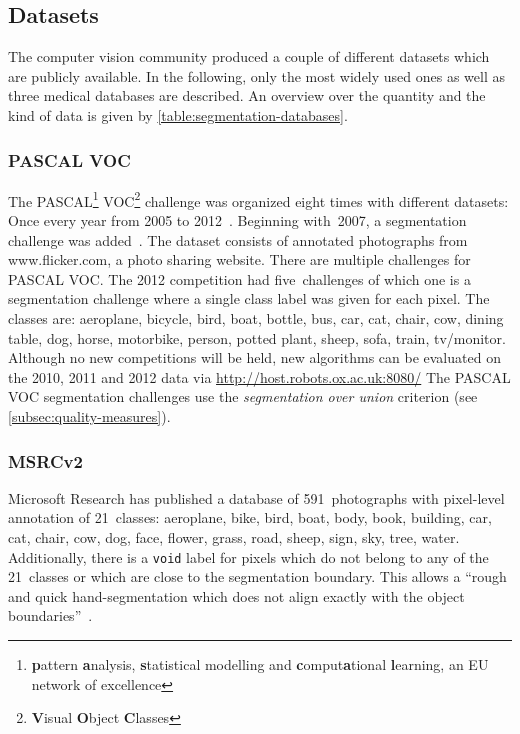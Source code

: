 \documentclass[technote,a4paper,leqno]{IEEEtran}
\begin{document}
\subsection{Datasets}
The computer vision community produced a couple of different datasets which are
publicly available. In the following, only the most widely used ones as well as
three medical databases are described. An overview over the quantity and
the kind of data is given by
\cref{table:segmentation-databases}.
\subsubsection{PASCAL VOC}
The PASCAL\footnote{\textbf{p}attern \textbf{a}nalysis, \textbf{s}tatistical
modelling and \textbf{c}omput\textbf{a}tional \textbf{l}earning, an EU network
of excellence} VOC\footnote{\textbf{V}isual \textbf{O}bject \textbf{C}lasses}
challenge was organized eight times with different datasets: Once every year
from 2005 to 2012~\cite{pascal-voc-2012}. Beginning with~2007, a segmentation
challenge was added~\cite{pascal-voc-2007}.
The dataset consists of annotated photographs from www.flicker.com, a photo
sharing website. There are multiple challenges for PASCAL VOC\@. The 2012
competition had five~challenges of which one is a segmentation challenge where
a single class label was given for each pixel. The classes are: aeroplane,
bicycle, bird, boat, bottle, bus, car, cat, chair, cow, dining table, dog,
horse, motorbike, person, potted plant, sheep, sofa, train, tv/monitor.
Although no new competitions will be held, new algorithms can be evaluated on
the 2010, 2011 and 2012 data via
\href{http://host.robots.ox.ac.uk:8080/}{http://host.robots.ox.ac.uk:8080/}
The PASCAL VOC segmentation challenges use the \textit{segmentation over union}
criterion (see \cref{subsec:quality-measures}).
\subsubsection{MSRCv2}\label{subsubsec:MSRCv2}
Microsoft Research has published a database of 591~photographs with pixel-level
annotation of 21~classes: aeroplane, bike, bird, boat, body, book, building,
car, cat, chair, cow, dog, face, flower, grass, road, sheep, sign, sky, tree,
water. Additionally, there is a \texttt{void} label for pixels which do not
belong to any of the 21~classes or which are close to the segmentation
boundary. This allows a \enquote{rough and quick hand-segmentation which does
not align exactly with the object boundaries}~\cite{shotton2006textonboost}.
\end{document}
